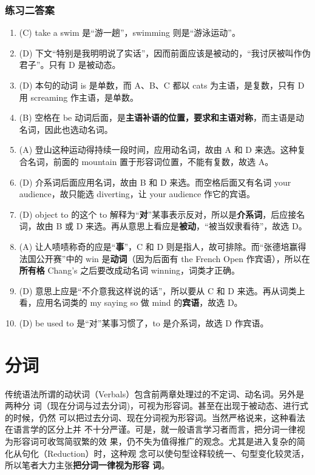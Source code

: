 \documentclass{yufa}
\begin{document}
\subsection{练习二答案}

\begin{enumerate}
\item (C) take a swim 是“游一趟”，swimming 则是“游泳运动”。
\item (D) 下文“特别是我明明说了实话”，因而前面应该是被动的，“我讨厌被叫作伪君子”。只有 D 是被动态。
\item (D) 本句的动词 is 是单数，而 A、B、C 都以 cats 为主语，是复数，只有 D 用 screaming 作主语，是单数。
\item (B) 空格在 be 动词后面，是\textbf{主语补语的位置，要求和主语对称}，而主语是动名词，因此也选动名词。
\item (A) 登山这种运动得持续一段时间，应用动名词，故由 A 和 D 来选。这种复合名词，前面的 mountain 置于形容词位置，不能有复数，故选 A。
\item (D) 介系词后面应用名词，故由 B 和 D 来选。而空格后面又有名词 your audience，故只能选 diverting，让 your audience 作它的宾语。
\item (D) object to 的这个 to 解释为“\textbf{对}”某事表示反对，所以是\textbf{介系词}，后应接名词，故由 B 或 D 来选。再从意思上看应是\textbf{被动}，“被当奴隶看待”，故选 D。
\item (A) 让人啧啧称奇的应是“\textbf{事}”，C 和 D 则是指人，故可排除。而“张德培赢得法国公开赛”中的 win 是\textbf{动词}（因为后面有 the French Open 作宾语），所以在\textbf{所有格} Chang's 之后要改成动名词 winning，词类才正确。
\item (D) 意思上应是“不介意我这样说的话”，所以要从 C 和 D 来选。再从词类上看，应用名词类的 my saying so 做 mind 的\textbf{宾语}，故选 D。
\item (D) be used to 是“对”某事习惯了，to 是介系词，故选 D 作宾语。
\end{enumerate}


\chapter{分词}

传统语法所谓的动状词（Verbals）包含前两章处理过的不定词、动名词。另外是两种分
词（现在分词与过去分词)，可视为形容词。甚至在出现于被动态、进行式的时候，仍然
可以把过去分词、现在分词视为形容词。当然严格说来，这种看法在语言学的区分上并
不十分严谨。可是，就一般语言学习者而言，把分词一律视为形容词可收驾简驭繁的效
果，仍不失为值得推广的观念。尤其是进入复杂的简化从句化（Reduction）时，这种观
念可以使句型诠释较统一、句型变化较灵活，所以笔者大力主张\textbf{把分词一律视为形容
  词}。
\end{document}
